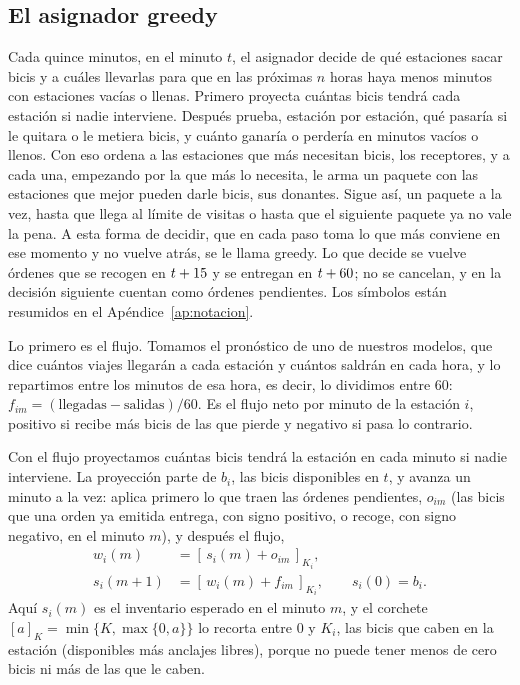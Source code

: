 \documentclass[conference,letterpaper,10pt]{IEEEtran}
\begin{document}
\subsection{El asignador greedy}\label{sec:asignador}
Cada quince minutos, en el minuto $t$, el asignador decide de qué estaciones sacar bicis y a cuáles llevarlas para que en las próximas $n$ horas haya menos minutos con estaciones vacías o llenas. Primero proyecta cuántas bicis tendrá cada estación si nadie interviene. Después prueba, estación por estación, qué pasaría si le quitara o le metiera bicis, y cuánto ganaría o perdería en minutos vacíos o llenos. Con eso ordena a las estaciones que más necesitan bicis, los receptores, y a cada una, empezando por la que más lo necesita, le arma un paquete con las estaciones que mejor pueden darle bicis, sus donantes. Sigue así, un paquete a la vez, hasta que llega al límite de visitas o hasta que el siguiente paquete ya no vale la pena. A esta forma de decidir, que en cada paso toma lo que más conviene en ese momento y no vuelve atrás, se le llama greedy. Lo que decide se vuelve órdenes que se recogen en $t+15$ y se entregan en $t+60$; no se cancelan, y en la decisión siguiente cuentan como órdenes pendientes. Los símbolos están resumidos en el Apéndice~\ref{ap:notacion}.

Lo primero es el flujo. Tomamos el pronóstico de uno de nuestros modelos, que dice cuántos viajes llegarán a cada estación y cuántos saldrán en cada hora, y lo repartimos entre los minutos de esa hora, es decir, lo dividimos entre 60: $f_{im}=(\text{llegadas}-\text{salidas})/60$. Es el flujo neto por minuto de la estación $i$, positivo si recibe más bicis de las que pierde y negativo si pasa lo contrario.

Con el flujo proyectamos cuántas bicis tendrá la estación en cada minuto si nadie interviene. La proyección parte de $b_i$, las bicis disponibles en $t$, y avanza un minuto a la vez: aplica primero lo que traen las órdenes pendientes, $o_{im}$ (las bicis que una orden ya emitida entrega, con signo positivo, o recoge, con signo negativo, en el minuto $m$), y después el flujo,
\begin{equation}\label{eq:proy}
\begin{aligned}
w_i(m)&=[\,s_i(m)+o_{im}\,]_{K_i},\\
s_i(m+1)&=[\,w_i(m)+f_{im}\,]_{K_i},\qquad s_i(0)=b_i.
\end{aligned}
\end{equation}
Aquí $s_i(m)$ es el inventario esperado en el minuto $m$, y el corchete $[a]_K=\min\{K,\max\{0,a\}\}$ lo recorta entre 0 y $K_i$, las bicis que caben en la estación (disponibles más anclajes libres), porque no puede tener menos de cero bicis ni más de las que le caben.
\end{document}
